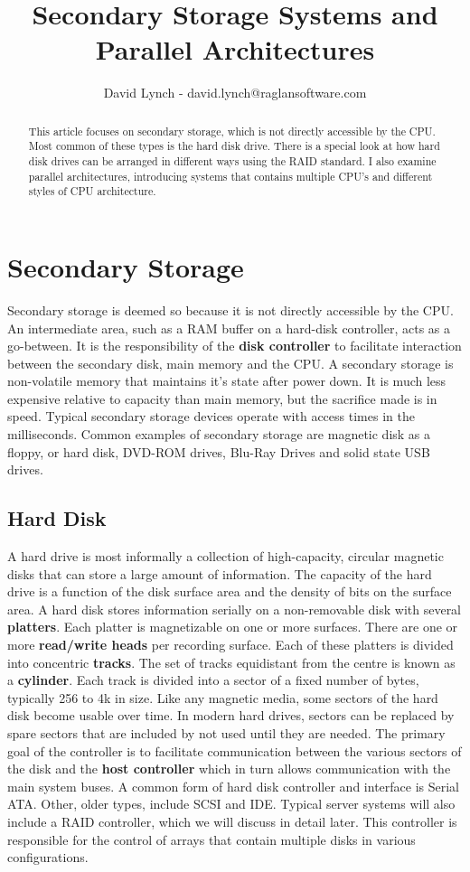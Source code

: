 \documentclass[10pt,a4paper]{article}
\title{Secondary Storage Systems and Parallel Architectures}
\author{David Lynch - david.lynch@raglansoftware.com }
\begin{document}
\maketitle
\begin{abstract}
This article focuses on secondary storage, which is not directly accessible by the CPU. Most common of these types is the hard disk drive. There is a special look at how hard disk drives can be arranged in different ways using the RAID standard. I also examine parallel architectures, introducing systems that contains multiple CPU's and different styles of CPU architecture. 
\end{abstract}
\section{Secondary Storage}
Secondary storage is deemed so because it is not directly accessible by the CPU. An intermediate area, such as a RAM buffer on a hard-disk controller, acts as a go-between. It is the responsibility of the {\bf disk controller} to facilitate interaction between the secondary disk, main memory and the CPU. A secondary storage is non-volatile memory that maintains it's state after power down. It is much less expensive relative to capacity than main memory, but the sacrifice made is in speed. Typical secondary storage devices operate with access times in the milliseconds. Common examples of secondary storage are magnetic disk as a floppy, or hard disk, DVD-ROM drives, Blu-Ray Drives and solid state USB drives.
\subsection{Hard Disk}
A hard drive is most informally a collection of high-capacity, circular magnetic disks that can store a large amount of information. The capacity of the hard drive is a function of the disk surface area and the density of bits on the surface area. A hard disk stores information serially on a non-removable disk with several {\bf platters}. Each platter is magnetizable on one or more surfaces. There are one or more {\bf read/write heads} per recording surface. Each of these platters is divided into concentric {\bf tracks}. The set of tracks equidistant from the centre is known as a {\bf cylinder}. Each track is divided into a sector of a fixed number of bytes, typically 256 to 4k in size. Like any magnetic media, some sectors of the hard disk become usable over time. In modern hard drives, sectors can be replaced by spare sectors that are included by not used until they are needed. The primary goal of the controller is to facilitate communication between the various sectors of the disk and the {\bf host controller} which in turn allows communication with the main system buses. A common form of hard disk controller and interface is Serial ATA. Other, older types, include SCSI and IDE. Typical server systems will also include a RAID controller, which we will discuss in detail later. This controller is responsible for the control of arrays that contain multiple disks in various configurations. 
\end{document}
